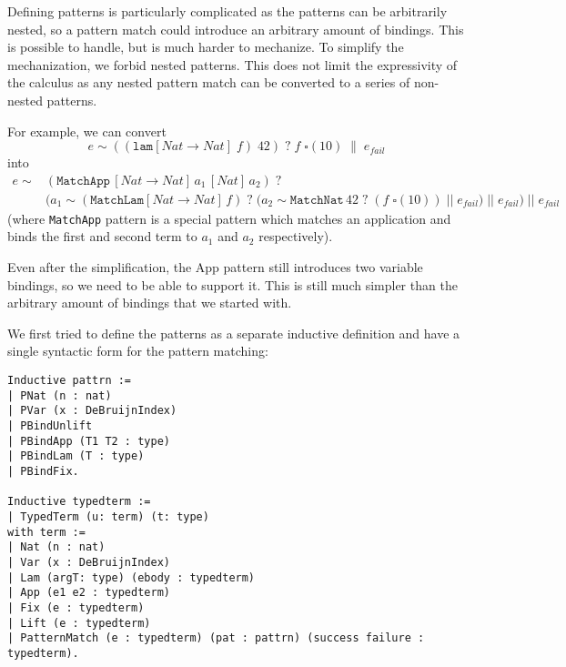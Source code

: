 \documentclass[runningheads]{article}
\newcommand{\app}[2]{#1\;#2}
\newcommand{\patapp}[2]{#1\;#2}
\newcommand{\patlam}[2]{\texttt{lam}[#2]\;#1}
\newcommand{\patmat}[4]{\patmatSP{#1}{#2}\patmatThen{#3}#4}
\newcommand{\patmatSP}[2]{#1 \sim #2\;?}
\newcommand{\patmatThen}[1]{\;#1\; \| \;}
\begin{document}
Defining patterns is particularly complicated as the patterns can be arbitrarily nested, so a pattern match could introduce an arbitrary amount of bindings. This is possible to handle, but is much harder to mechanize. To simplify the mechanization, we forbid nested patterns. This does not limit the expressivity of the calculus as any nested pattern match can be converted to a series of non-nested patterns.


For example, we can convert 
\begin{equation*}
\patmat{e}{(\patapp{(\patlam{f}{Nat \to Nat})}{42})}{\app{f}{\square(10)}}{e_{fail}}
\end{equation*}
into
\begin{align*}
e \sim & (\texttt{MatchApp} \, [Nat \to Nat] \, a_1 \, [Nat] \, a_2) \; ? \\
&\Bigg(a_1 \sim (\texttt{MatchLam}[Nat \to Nat] \, f) \; ? \; \big(a_2 \sim \texttt{MatchNat} \, 42 \; ? \; (f \; \square(10))\; || \; e_{fail}\big)\; || \; e_{fail}\Bigg)\; || \; e_{fail}
\end{align*}
(where \texttt{MatchApp} pattern is a special pattern which matches an application and binds the first and second term to $a_1$ and $a_2$ respectively).


Even after the simplification, the App pattern still introduces two variable bindings, so we need to be able to support it. This is still much simpler than the arbitrary amount of bindings that we started with.

We first tried to define the patterns as a separate inductive definition and have a single syntactic form for the pattern matching:
\begin{verbatim}
Inductive pattrn :=
| PNat (n : nat)
| PVar (x : DeBruijnIndex)
| PBindUnlift
| PBindApp (T1 T2 : type)
| PBindLam (T : type)
| PBindFix.

Inductive typedterm :=
| TypedTerm (u: term) (t: type)
with term :=
| Nat (n : nat)
| Var (x : DeBruijnIndex)
| Lam (argT: type) (ebody : typedterm)
| App (e1 e2 : typedterm)
| Fix (e : typedterm)
| Lift (e : typedterm)
| PatternMatch (e : typedterm) (pat : pattrn) (success failure : typedterm).
\end{verbatim}
\end{document}

